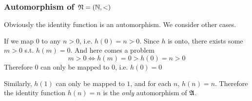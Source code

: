 \subsubsection{Automorphism of $\mathfrak{N} = (\mathbb{N}, <)$}

Obviously the identity function is an automorphism. We consider other cases.

If we map $0$ to any $n>0$, i.e. $h(0) = n > 0$. Since $h$ is onto, there exists some $m > 0$ s.t. $h(m) = 0$. And here comes a problem
\[ m > 0 \iff h(m) = 0 > h(0) = n > 0 \]
Therefore $0$ can only be mapped to $0$, i.e. $h(0) = 0$

Similarly, $h(1)$ can only be mapped to $1$, and for each $n$, $h(n) = n$. Therefore the identity function $h(n) = n$ is the \emph{only} automorphism of $\mathfrak{A}$.

